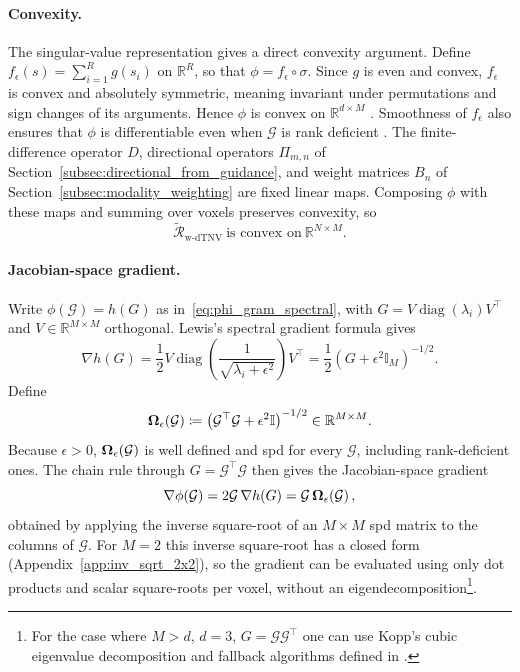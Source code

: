 \paragraph{Convexity.}
The singular-value representation gives a direct convexity argument. Define $f_\epsilon(s)=\sum_{i=1}^{R}g(s_i)$ on $\mathbb{R}^R$, so that $\phi=f_\epsilon\circ\sigma$. Since $g$ is even and convex, $f_\epsilon$ is convex and absolutely symmetric, meaning invariant under permutations and sign changes of its arguments. Hence $\phi$ is convex on $\mathbb{R}^{d\times M}$ \cite[Corollary~2.6]{lewisConvexAnalysisUnitarily1995}. Smoothness of $f_\epsilon$ also ensures that $\phi$ is differentiable even when $\mathcal{G}$ is rank deficient \cite[Theorem~3.1]{lewisConvexAnalysisUnitarily1995}. The finite-difference operator $D$, directional operators $\Pi_{m,n}$ of Section~\ref{subsec:directional_from_guidance}, and weight matrices $B_n$ of Section~\ref{subsec:modality_weighting} are fixed linear maps. Composing $\phi$ with these maps and summing over voxels preserves convexity, so
\begin{equation}
    \widetilde{\mathcal{R}}_{\mathrm{w\text{-}dTNV}} \ \text{is convex on}\ \mathbb{R}^{N\times M}.
    \label{eq:wdtnv_convex}
\end{equation}

\paragraph{Jacobian-space gradient.}
Write $\phi(\mathcal{G})=h(G)$ as in~\eqref{eq:phi_gram_spectral}, with $G=V\operatorname{diag}(\lambda_i)V^\top$ and $V\in\mathbb{R}^{M\times M}$ orthogonal. Lewis's spectral gradient formula \cite[Theorem~1.1]{lewisDerivativesSpectralFunctions1996} gives
\begin{equation}
    \nabla h(G)
    =\frac12 V\operatorname{diag}\!\left(\frac{1}{\sqrt{\lambda_i+\epsilon^2}}\right)V^\top
    =\frac12(G+\epsilon^2\mathbb{I}_M)^{-1/2}.
\end{equation}
Define
\begin{equation}
    \bm{\Omega}_{\epsilon}\!\left(\mathcal{G}\right) \coloneqq \left(\mathcal{G}^\top \mathcal{G}+\epsilon^2\mathbb{I}\right)^{-1/2}
    \in\mathbb{R}^{M\times M}.
    \label{eq:spectral_weight}
\end{equation}
Because $\epsilon>0$, $\bm{\Omega}_{\epsilon}\!\left(\mathcal{G}\right)$ is well defined and \gls{spd} for every $\mathcal{G}$, including rank-deficient ones. The chain rule through $G=\mathcal{G}^\top\mathcal{G}$ then gives the Jacobian-space gradient
\begin{equation}\label{eq:phi_grad_inv_sqrt}
\nabla\phi(\mathcal{G})=2\mathcal{G}\,\nabla h(G)=\mathcal{G}\,\bm{\Omega}_{\epsilon}\!\left(\mathcal{G}\right),
\end{equation}
obtained by applying the inverse square-root of an $M\times M$ \gls{spd} matrix to the columns of $\mathcal{G}$. For $M=2$ this inverse square-root has a closed form (Appendix~\ref{app:inv_sqrt_2x2}), so the gradient can be evaluated using only dot products and scalar square-roots per voxel, without an eigendecomposition\footnote{For the case where $M>d$, $d=3$, $G=\mathcal{G}\mathcal{G}^\top$ one can use Kopp's cubic eigenvalue decomposition and fallback algorithms defined in \cite{koppEfficientNumericalDiagonalization2008}.}.

